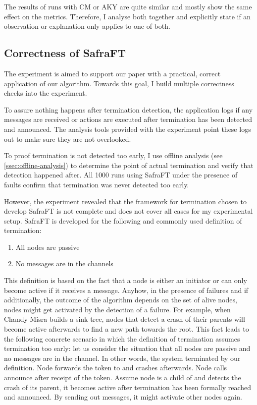 The results of runs with CM or AKY are quite similar and mostly show the same effect on the metrics.
Therefore, I analyse both together and explicitly state if an observation or explanation only applies to one of both.

\subsection{Correctness of SafraFT}
\label{ssec:correctness}
The experiment is aimed to support our paper with a practical, correct application of our algorithm.
Towards this goal, I build multiple correctness checks into the experiment. 

To assure nothing happens after termination detection, the application logs if any messages are received or actions are executed after termination has been detected and announced. 
The analysis tools provided with the experiment point these logs out to make sure they are not overlooked.

To proof termination is not detected too early, I use offline analysis (see \cref{ssec:offline-analysis}) to determine the point of actual termination and verify that detection happened after.
All 1000 runs using SafraFT under the presence of faults confirm that termination was never detected too early.

However, the experiment revealed that the framework for termination chosen to develop SafraFT is not complete and does not cover all cases for my experimental setup.
SafraFT is developed for the following and commonly used definition of termination:
\begin{enumerate}
	\item All nodes are passive
	\item No messages are in the channels
\end{enumerate}
This definition is based on the fact that a node is either an initiator or can only become active if it receives a message. 
Anyhow, in the presence of failures and if additionally, the outcome of the algorithm depends on the set of alive nodes, nodes might get activated by the detection of a failure.
For example, when Chandy Misra builds a sink tree, nodes that detect a crash of their parents will become active afterwards to find a new path towards the root.
This fact leads to the following concrete scenario in which the definition of termination assumes termination too early: let us consider the situation that all nodes are passive and no messages are in the channel. 
In other words, the system terminated by our definition.
Node  forwards the token to  and crashes afterwards. 
Node  calls announce after receipt of the token.
Assume node  is a child of  and detects the crash of its parent, it becomes active after termination has been formally reached and announced.
By sending out  messages, it might activate other nodes again.


